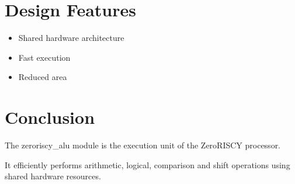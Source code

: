 \documentclass[letterpaper,10pt,english]{sphinxmanual}
\begin{document}
\sphinxstepscope


\chapter{Design Features}
\label{\detokenize{alu_designfeatures:design-features}}\label{\detokenize{alu_designfeatures::doc}}\begin{itemize}
\item {} 
\sphinxAtStartPar
Shared hardware architecture

\item {} 
\sphinxAtStartPar
Fast execution

\item {} 
\sphinxAtStartPar
Reduced area

\end{itemize}

\sphinxstepscope


\chapter{Conclusion}
\label{\detokenize{alu_conclusions:conclusion}}\label{\detokenize{alu_conclusions::doc}}
\sphinxAtStartPar
The zeroriscy\_alu module is the execution unit of the
Zero\sphinxhyphen{}RISCY processor.

\sphinxAtStartPar
It efficiently performs arithmetic, logical,
comparison and shift operations using shared hardware
resources.



\renewcommand{\indexname}{Index}
\printindex
\end{document}
